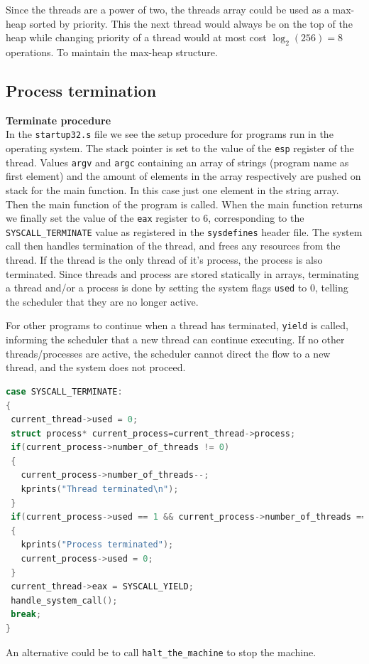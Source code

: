 Since the threads are a power of two, the threads array could be used as a max-heap sorted by priority. This the next thread would always be on the top of the heap while changing priority of a thread would at most cost $\log_2(256)=8$ operations. To maintain the max-heap structure.

\subsection{Process termination}



\textbf{Terminate procedure} \\
In the \texttt{startup32.s} file we see the setup procedure for programs run in the operating system. The stack pointer is set to the value of the \texttt{esp} register of the thread. Values \texttt{argv} and \texttt{argc} containing an array of strings (program name as first element) and the amount of elements in the array respectively are pushed on stack for the main function. In this case just one element in the string array. Then the main function of the program is called. When the main function returns we finally set the value of the \texttt{eax} register to 6, corresponding to the \texttt{SYSCALL\_TERMINATE} value as registered in the \texttt{sysdefines} header file. The system call then handles termination of the thread, and frees any resources from the thread. If the thread is the only thread of it's process, the process is also terminated. Since threads and process are stored statically in arrays, terminating a thread and/or a process is done by setting the system flags \texttt{used} to 0, telling the scheduler that they are no longer active. 

For other programs to continue when a thread has terminated, \texttt{yield} is called, informing the scheduler that a new thread can continue executing. If no other threads/processes are active, the scheduler cannot direct the flow to a new thread, and the system does not proceed. 
\begin{lstlisting}[language=c, caption=System call terminate]
case SYSCALL_TERMINATE:
{
 current_thread->used = 0;
 struct process* current_process=current_thread->process;
 if(current_process->number_of_threads != 0)
 {
   current_process->number_of_threads--;
   kprints("Thread terminated\n");
 }
 if(current_process->used == 1 && current_process->number_of_threads == 0)
 {
   kprints("Process terminated");
   current_process->used = 0;
 }
 current_thread->eax = SYSCALL_YIELD;
 handle_system_call();
 break;
} 
\end{lstlisting}
An alternative could be to call \texttt{halt\_the\_machine} to stop the machine.

